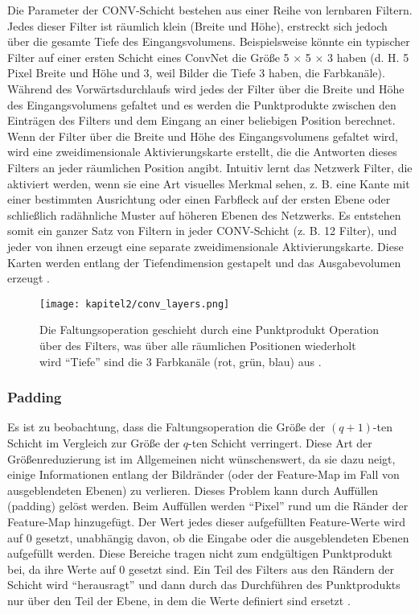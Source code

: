   Die Parameter der CONV-Schicht bestehen aus einer Reihe von lernbaren Filtern. Jedes dieser Filter ist räumlich klein (Breite und Höhe), erstreckt sich jedoch über die gesamte Tiefe des Eingangsvolumens. Beispielsweise könnte ein typischer Filter auf einer ersten Schicht eines ConvNet die Größe 5 × 5 × 3 haben (d. H. 5 Pixel Breite und Höhe und 3, weil Bilder die Tiefe 3 haben, die Farbkanäle). Während des Vorwärtsdurchlaufs wird jedes der Filter über die Breite und Höhe des Eingangsvolumens gefaltet und es werden die Punktprodukte zwischen den Einträgen des Filters und dem Eingang an einer beliebigen Position berechnet. Wenn der Filter über die Breite und Höhe des Eingangsvolumens gefaltet wird, wird eine zweidimensionale Aktivierungskarte erstellt, die die Antworten dieses Filters an jeder räumlichen Position angibt. Intuitiv lernt das Netzwerk Filter, die aktiviert werden, wenn sie eine Art visuelles Merkmal sehen, z. B. eine Kante mit einer bestimmten Ausrichtung oder einen Farbfleck auf der ersten Ebene oder schließlich radähnliche Muster auf höheren Ebenen des Netzwerks. Es entstehen somit ein ganzer Satz von Filtern in jeder CONV-Schicht (z. B. 12 Filter), und jeder von ihnen erzeugt eine separate zweidimensionale Aktivierungskarte. Diese Karten werden entlang der Tiefendimension gestapelt und das Ausgabevolumen erzeugt \cite*{StanfordUniversityCoursecs231n2018a}.

  \begin{figure}[H]
    \centering
    \texttt{[image: kapitel2/conv\_layers.png]}
    \caption[Die Faltung in einem CNN]{Die Faltungsoperation geschieht durch eine Punktprodukt Operation über des Filters, was über alle räumlichen Positionen wiederholt wird \enquote{Tiefe} sind die 3 Farbkanäle (rot, grün, blau) aus \cite*[321]{Aggarwal2018}.}
    \label{Kap2:Conv}
  \end{figure}

  \subsubsection{Padding}
  Es ist zu beobachtung, dass die Faltungsoperation die Größe der $(q + 1)$-ten Schicht im Vergleich zur Größe der $q$-ten Schicht verringert. Diese Art der Größenreduzierung ist im Allgemeinen nicht wünschenswert, da sie dazu neigt, einige Informationen entlang der Bildränder (oder der Feature-Map im Fall von ausgeblendeten Ebenen) zu verlieren. Dieses Problem kann durch Auffüllen (padding) gelöst werden. Beim Auffüllen werden  \enquote{Pixel} rund um die Ränder der Feature-Map hinzugefügt. Der Wert jedes dieser aufgefüllten Feature-Werte wird auf 0 gesetzt, unabhängig davon, ob die Eingabe oder die ausgeblendeten Ebenen aufgefüllt werden. Diese Bereiche tragen nicht zum endgültigen Punktprodukt bei, da ihre Werte auf 0 gesetzt sind. Ein Teil des Filters aus den Rändern der Schicht wird \enquote{herausragt} und dann durch das Durchführen des Punktprodukts nur über den Teil der Ebene, in dem die Werte definiert sind ersetzt \cite*[323]{Aggarwal2018}.


